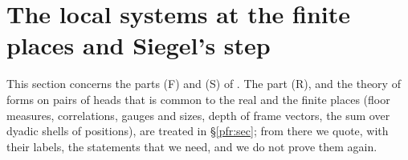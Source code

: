 \documentclass[10pt]{amsart}
\theoremstyle{definition}
\theoremstyle{remark}
\providecommand{\auO}{\mathcal O}
\providecommand{\auPl}{\Phi}
\providecommand{\auU}{\mathrm U}
\begin{document}
\providecommand{\auO}{\mathcal O}
\providecommand{\auPl}{\Phi}
\providecommand{\auU}{\mathrm U}
\providecommand{\auGL}{\mathrm{GL}}
\providecommand{\auA}{\mathbb A}
\providecommand{\auF}{\mathbb F}
\providecommand{\aurd}{\mathrm{rd}_E}
\providecommand{\aubar}[1]{\overline{#1}}
\providecommand{\panot}[1]{\par\smallskip{\raggedright\noindent\textbf{[Not proved here:} #1\textbf{]}\par}\smallskip}
\providecommand{\pbR}{\overline R_0}
\providecommand{\pbUb}{\overline U}
\providecommand{\pbHb}{\overline H}
\providecommand{\pbvol}{\operatorname{vol}}
\providecommand{\pbFix}{\operatorname{Fix}}
\providecommand{\pbDmain}{\mathcal D_{\mathrm{main}}}
\providecommand{\pbmGf}{G^{\flat}}
\providecommand{\pbmXp}{X^{+}}
\providecommand{\auG}{\overline G}
\providecommand{\pbmOrb}{\mathcal O}
\providecommand{\pbmT}{\mathcal T}
\providecommand{\pbmRT}{R_T}
\providecommand{\pbmE}{\mathsf E}
\providecommand{\pbmn}{\mathsf n}
\providecommand{\pbmden}{\mathsf{den}}
\providecommand{\pbmvol}{\mathsf v}
\providecommand{\pbmaS}{\mathsf a_*}
\providecommand{\pbmrS}{\mathsf r_*}
\providecommand{\pbmcG}{c_G}
\providecommand{\pffET}{E_T}
\providecommand{\pffOT}{\auO_T}
\providecommand{\pfgOh}{\auO_{\mathrm h}}
\providecommand{\pfgQ}{\mathsf Q_N}
\providecommand{\pffG}{G_T}
\providecommand{\pffK}{K_T}
\providecommand{\pffKM}{K_T(M)}
\providecommand{\pffch}{\chi_M}
\providecommand{\pffW}{W_Z}
\providecommand{\pffm}{\varkappa}
\providecommand{\pffr}{\rho}
\providecommand{\pffl}{\mathsf f}
\providecommand{\pffI}{\mathcal I}
\providecommand{\pffZ}{\mathsf Z}
\providecommand{\pfrF}{\mathsf F}
\providecommand{\pfrB}{\mathsf B}
\providecommand{\pfrM}{\mathsf M}
\providecommand{\pfrm}{\mathsf m}
\providecommand{\pfrN}{\mathsf N}
\providecommand{\pfrkap}{\kappa}
\providecommand{\pfrH}{\mathsf H}
\providecommand{\pbmKl}{\mathsf{Kl}}
\providecommand{\pbmass}{\operatorname{mass}}
\providecommand{\pfrmod}{\operatorname{mod}}
\providecommand{\pfrI}{\mathcal I}
\providecommand{\pfrip}[2]{\langle#1,#2\rangle}

\section{The local systems at the finite places and Siegel's step}\label{pff:sec}

This section concerns the parts \textup{(F)} and \textup{(S)} of {\cite[Theorem~3.51]{P51}}. The
part \textup{(R)}, and the theory of forms on pairs of heads that is common to the real and the
finite places (floor measures, correlations, gauges and sizes, depth of frame vectors, the sum
over dyadic shells of positions), are treated in \S\ref{pfr:sec}; from there we quote, with
their labels, the statements that we need, and we do not prove them again.
\end{document}

